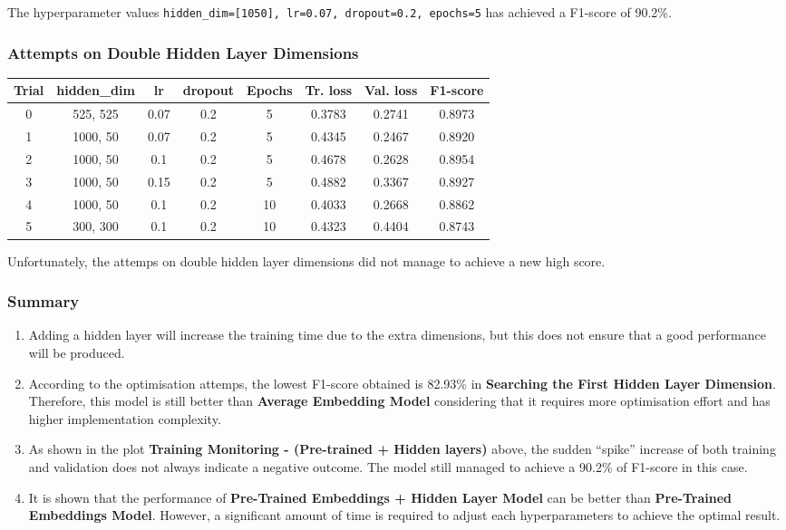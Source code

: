 \documentclass[11pt]{article}
\begin{document}
The hyperparameter values
\texttt{hidden\_dim={[}1050{]},\ lr=0.07,\ dropout=0.2,\ epochs=5} has
achieved a F1-score of 90.2\%.

\hypertarget{attempts-on-double-hidden-layer-dimensions}{%
\subsubsection{Attempts on Double Hidden Layer
Dimensions}\label{attempts-on-double-hidden-layer-dimensions}}

\begin{longtable}[]{@{}cccccccc@{}}
\toprule
Trial & hidden\_dim & lr & dropout & Epochs & Tr. loss & Val. loss &
F1-score\tabularnewline
\midrule
\endhead
0 & 525, 525 & 0.07 & 0.2 & 5 & 0.3783 & 0.2741 & 0.8973\tabularnewline
1 & 1000, 50 & 0.07 & 0.2 & 5 & 0.4345 & 0.2467 & 0.8920\tabularnewline
2 & 1000, 50 & 0.1 & 0.2 & 5 & 0.4678 & 0.2628 & 0.8954\tabularnewline
3 & 1000, 50 & 0.15 & 0.2 & 5 & 0.4882 & 0.3367 & 0.8927\tabularnewline
4 & 1000, 50 & 0.1 & 0.2 & 10 & 0.4033 & 0.2668 & 0.8862\tabularnewline
5 & 300, 300 & 0.1 & 0.2 & 10 & 0.4323 & 0.4404 & 0.8743\tabularnewline
\bottomrule
\end{longtable}

Unfortunately, the attemps on double hidden layer dimensions did not
manage to achieve a new high score.

\hypertarget{summary}{%
\subsubsection{Summary}\label{summary}}

\begin{enumerate}
\def\labelenumi{\arabic{enumi}.}
\item
  Adding a hidden layer will increase the training time due to the extra
  dimensions, but this does not ensure that a good performance will be
  produced.
\item
  According to the optimisation attemps, the lowest F1-score obtained is
  82.93\% in \textbf{Searching the First Hidden Layer Dimension}.
  Therefore, this model is still better than \textbf{Average Embedding
  Model} considering that it requires more optimisation effort and has
  higher implementation complexity.
\item
  As shown in the plot \textbf{Training Monitoring - (Pre-trained +
  Hidden layers)} above, the sudden ``spike'' increase of both training
  and validation does not always indicate a negative outcome. The model
  still managed to achieve a 90.2\% of F1-score in this case.
\item
  It is shown that the performance of \textbf{Pre-Trained Embeddings +
  Hidden Layer Model} can be better than \textbf{Pre-Trained Embeddings
  Model}. However, a significant amount of time is required to adjust
  each hyperparameters to achieve the optimal result.
\end{enumerate}
\end{document}
